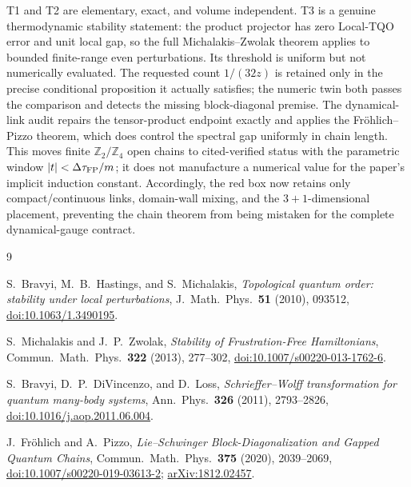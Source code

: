 \documentclass[11pt]{article}
\theoremstyle{remark}
\begin{document}
T1 and T2 are elementary, exact, and volume independent.  T3 is a
genuine thermodynamic stability statement: the product projector has
zero Local-TQO error and unit local gap, so the full
Michalakis--Zwolak theorem applies to bounded finite-range even
perturbations.  Its threshold is uniform but not numerically evaluated.
The requested count $1/(32z)$ is retained only in the precise
conditional proposition it actually satisfies; the numeric twin both
passes the comparison and detects the missing block-diagonal premise.
The dynamical-link audit repairs the tensor-product endpoint exactly and
applies the Fröhlich--Pizzo theorem, which does control the spectral gap
uniformly in chain length.  This moves finite
$\mathbb Z_2/\mathbb Z_4$ open chains to cited-verified status with the
parametric window $|t|<\Delta\tau_{\rm FP}/m$; it does not manufacture a
numerical value for the paper's implicit induction constant.  Accordingly,
the red box now retains only compact/continuous links, domain-wall
mixing, and the $3+1$-dimensional placement, preventing the chain theorem
from being mistaken for the complete dynamical-gauge contract.

\begin{thebibliography}{9}

S.~Bravyi, M.~B.~Hastings, and S.~Michalakis,
\emph{Topological quantum order: stability under local perturbations},
J.\ Math.\ Phys.\ \textbf{51} (2010), 093512,
\href{https://doi.org/10.1063/1.3490195}
{doi:10.1063/1.3490195}.

S.~Michalakis and J.~P.~Zwolak,
\emph{Stability of Frustration-Free Hamiltonians},
Commun.\ Math.\ Phys.\ \textbf{322} (2013), 277--302,
\href{https://doi.org/10.1007/s00220-013-1762-6}
{doi:10.1007/s00220-013-1762-6}.

S.~Bravyi, D.~P.~DiVincenzo, and D.~Loss,
\emph{Schrieffer--Wolff transformation for quantum many-body systems},
Ann.\ Phys.\ \textbf{326} (2011), 2793--2826,
\href{https://doi.org/10.1016/j.aop.2011.06.004}
{doi:10.1016/j.aop.2011.06.004}.

J.~Fröhlich and A.~Pizzo,
\emph{Lie--Schwinger Block-Diagonalization and Gapped Quantum Chains},
Commun.\ Math.\ Phys.\ \textbf{375} (2020), 2039--2069,
\href{https://doi.org/10.1007/s00220-019-03613-2}
{doi:10.1007/s00220-019-03613-2};
\href{https://arxiv.org/abs/1812.02457}
{arXiv:1812.02457}.

\end{thebibliography}
\end{document}
